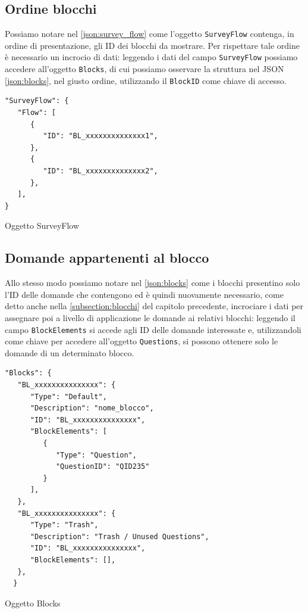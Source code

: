 \subsection{Ordine blocchi}
Possiamo notare nel \autoref{json:survey_flow} come l'oggetto \texttt{SurveyFlow} contenga, in ordine di presentazione, gli ID dei blocchi da mostrare. Per rispettare tale ordine è necessario un incrocio di dati: leggendo i dati del campo \texttt{SurveyFlow} possiamo accedere all'oggetto \texttt{Blocks}, di cui possiamo osservare la struttura nel JSON \ref{json:blocks}, nel giusto ordine, utilizzando il \texttt{BlockID} come chiave di accesso.

\begin{json}
\begin{verbatim}
"SurveyFlow": {
   "Flow": [
      {
         "ID": "BL_xxxxxxxxxxxxxx1",
      },
      {
         "ID": "BL_xxxxxxxxxxxxxx2",
      },
   ],
}
\end{verbatim}
\caption{Oggetto SurveyFlow}
\label{json:survey_flow}
\end{json}

\newpage
\subsection{Domande appartenenti al blocco}
Allo stesso modo possiamo notare nel \autoref{json:blocks} come i blocchi presentino solo l'ID delle domande che contengono ed è quindi nuovamente necessario, come detto anche nella \autoref{subsection:blocchi} del capitolo precedente, incrociare i dati per assegnare poi a livello di applicazione le domande ai relativi blocchi: leggendo il campo \texttt{BlockElements} si accede agli ID delle domande interessate e, utilizzandoli come chiave per accedere all'oggetto \texttt{Questions}, si possono ottenere solo le domande di un determinato blocco.

\begin{json}
\begin{verbatim}
"Blocks": {
   "BL_xxxxxxxxxxxxxxx": {
      "Type": "Default",
      "Description": "nome_blocco",
      "ID": "BL_xxxxxxxxxxxxxxx",
      "BlockElements": [
         {
            "Type": "Question",
            "QuestionID": "QID235"
         }
      ],
   },
   "BL_xxxxxxxxxxxxxxx": {
      "Type": "Trash",
      "Description": "Trash / Unused Questions",
      "ID": "BL_xxxxxxxxxxxxxxx",
      "BlockElements": [],
   },
  }
\end{verbatim}
\caption{Oggetto Blocks}
\label{json:blocks}
\end{json}

